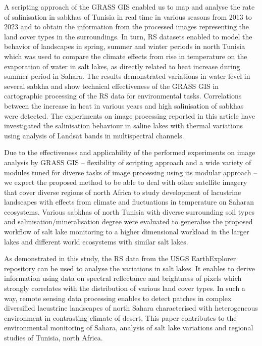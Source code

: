 \documentclass[land,article,submit,pdftex,moreauthors]{Definitions/mdpi}
\begin{document}
A scripting approach of the GRASS GIS enabled us to map and analyse the rate of salinisation in sabkhas of Tunisia in real time in various seasons from 2013 to 2023 and to obtain the information from the processed images representing the land cover types in the surroundings. In turn, RS datasets enabled to model the behavior of landscapes in spring, summer and winter periods in north Tunisia which was used to compare the climate effects from rise in temperature on the evaporation of water in salt lakes, as directly related to heat increase during summer period in Sahara. The results demonstrated variations in water level in several sabkha and show technical effectiveness of the GRASS GIS in cartographic processing of the RS data for environmental tasks. Correlations between the increase in heat in various years and high salinisation of sabkhas were detected. The experiments on image processing reported in this article have investigated the salinisation behaviour in saline lakes with thermal variations using analysis of Landsat bands in multispectral channels. 

Due to the effectiveness and applicability of the performed experiments on image analysis by GRASS GIS -- flexibility of scripting approach and a wide variety of modules tuned for diverse tasks of image processing using its modular approach -- we expect the proposed method to be able to deal with other satellite imagery that cover diverse regions of north Africa to study development of lacustrine landscapes with effects from climate and fluctuations in temperature on Saharan ecosystems. Various sabkhas of north Tunisia with diverse surrounding soil types and salinisation/mineralisation degree were evaluated to generalise the proposed workflow of salt lake monitoring to a higher dimensional workload in the larger lakes and different world ecosystems with similar salt lakes. 

As demonstrated in this study, the RS data from the USGS EarthExplorer repository can be used to analyse the variations in salt lakes. It enables to derive information using data on spectral reflectance and brightness of pixels which strongly correlates with the distribution of various land cover types. In such a way, remote sensing data processing enables to detect patches in complex diversified lacustrine landscapes of north Sahara characterised with heterogeneous environment in contrasting climate of desert. This paper contributes to the environmental monitoring of Sahara, analysis of salt lake variations and regional studies of Tunisia, north Africa.
\end{document}
